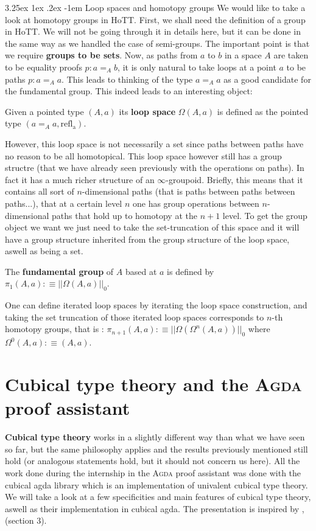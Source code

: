\documentclass{report}
\makeatletter
\renewcommand\paragraph{\@startsection{paragraph}{5}{\z@}%
  {3.25ex \@plus1ex \@minus.2ex}%
  {-1em}%
  {\normalfont\normalsize\bfseries}}
\makeatother
\begin{document}
\paragraph{Loop spaces and homotopy groups} We would like to take a look at homotopy groups in HoTT. First, we shall need the definition of a group in HoTT. We will not be going through it in details here, but it can be done in the same way as we handled the case of semi-groups. The important point is that we require \textbf{groups to be sets}. Now, as paths from $a$ to $b$ in a space $A$ are taken to be equality proofs $p :a=_A b$, it is only natural to take loops at a point $a$ to be paths $p : a=_A a$. This leads to thinking of the type $a=_A a$ as a good candidate for the fundamental group. This indeed leads to an interesting object:
\begin{mydef}
  Given a pointed type $(A,a)$ its \textbf{loop space} $\Omega(A,a)$ is defined as the pointed type $(a=_Aa,\mathrm{refl_a})$. 
\end{mydef}
However, this loop space is not necessarily a set since paths between paths have no reason to be all homotopical. This loop space however still has a group structre (that we have already seen previously with the operations on paths). In fact it has a much richer structure of an $\infty$-groupoid. Briefly, this means that it contains all sort of $n$-dimensional paths (that is paths between paths between paths...), that at a certain level $n$ one has group operations between $n$-dimensional paths that hold up to homotopy at the $n+1$ level. To get the group object we want we just need to take the set-truncation of this space and it will have a group structure inherited from the group structure of the loop space, aswell as being a set.
\begin{mydef}
  The \textbf{fundamental group} of $A$ based at $a$ is defined by $\pi_1(A,a) :\equiv ||\Omega(A,a)||_0$.
\end{mydef}
One can define iterated loop spaces by iterating the loop space construction, and taking the set truncation of those iterated loop spaces corresponds to $n$-th homotopy groups, that is : $\pi_{n+1}(A,a) :\equiv ||\Omega(\Omega^n(A,a))||_0$ where $\Omega^0(A,a):\equiv (A,a)$.
\section{Cubical type theory and the \textsc{Agda} proof assistant}
\textbf{Cubical type theory} works in a slightly different way than what we have seen so far, but the same philosophy applies and the results previously mentioned still hold (or analogous statements hold, but it should not concern us here). All the work done during the internship in the \textsc{Agda} proof assistant was done with the cubical agda library \cite{cubicalagda} which is an implementation of univalent cubical type theory. We will take a look at a few specificities and main features of cubical type theory, aswell as their implementation in cubical agda. The presentation is inspired by \cite{CubAgdaDoc} , \cite{CubTT} (section 3).
\end{document}
